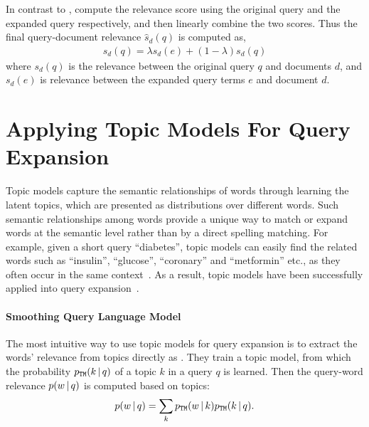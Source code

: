 In contrast to \citet{zhai-01b}, \citet{Lavrenko-2001} compute
the relevance score using the original query and the expanded query
respectively, and then linearly combine the two scores. Thus the final
query-document relevance $\hat{s}_d(q)$ is computed as,
\begin{align}
\label{eq:rm_qe_comb}
\hat{s}_d(q) = \lambda s_d(e) + (1-\lambda)s_d(q)
\end{align}
where $s_d(q)$ is the relevance between the original query $q$ and
documents $d$, and $s_d(e)$ is relevance between the expanded query
terms $e$ and document $d$.

\section{Applying Topic Models For Query Expansion}

Topic models capture the semantic relationships of words through
learning the latent topics, which are presented as distributions over
different words. Such semantic relationships among words provide a
unique way to match or expand words at the semantic level rather than
by a direct spelling matching. For example, given a short query ``diabetes'',
topic models can easily find the related words such as
``insulin'', ``glucose'', ``coronary'' and ``metformin'' etc., 
as they often occur in the same context~\citep{Zeng-2012}. 
As a result, topic models have been
successfully applied into query expansion~\citep{Yi-2009,Park-2009,Zeng-2012}.

\paragraph{Smoothing Query Language Model}


The most intuitive way to use topic models for query expansion is to
extract the words' relevance from topics directly as
\citet{Yi-2009}. They train a topic model, from which the probability
$p_{\texttt{TM}}(k \, | \, q)$ of a topic $k$ in a query $q$ is learned. Then
the query-word relevance $p(w \, | \, q)$ is computed based on topics:
\begin{align}
\label{eq:query_word_prob}
p(w \, | \, q) = \sum_k p_{\texttt{TM}}(w \, | \, k) p_{\texttt{TM}}(k \, | \, q).
\end{align}

